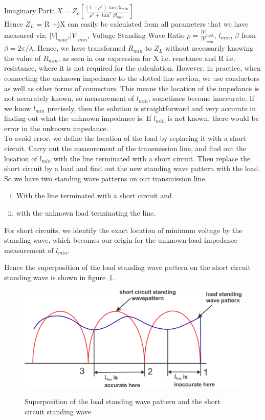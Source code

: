 Imaginary Part: $ X = Z_o[\frac{(1-\rho^{2})\tan\beta l_{min}}{\rho^{2} + \tan^{2}\beta l_{min}}]  $\\

Hence $Z_{L}$ = R +jX can easily be calculated from all parameters that we have measured viz; $|V|_{max}$,$|V|_{min}$, Voltage Standing Wave Ratio $\rho = \frac{|V|_{max}}{|V|_{min}}$, $l_{min}$, $\beta$ from $\beta = 2\pi/\lambda$. Hence, we have transformed $R_{min}$ to $Z_{L}$ without necessarily knowing the value of $R_{min}$, as seen in our expression for X i.e. reactance and R i.e. resistance, where it is not required for the calculation. 
However, in practice, when connecting the unknown impedance to the slotted line section, we use conductors as well as other forms of connectors. This means the location of the impedance is not accurately known, so measurement of $l_{min}$, sometimes become inaccurate. If we know $l_{min}$ precisely, then the solution is straightforward and very accurate in finding out what the unknown impedance is. If $l_{min}$ is not known, there would be error in the unknown impedance.\\

To avoid error, we define the location of the load by replacing it with a short circuit. Carry out the measurement of the transmission line, and find out the location of $l_{min}$ with the line terminated with a short circuit. Then replace the short circuit by a load and find out the new standing wave pattern with the load. So we have two standing wave patterns on our transmission line. 
\begin{enumerate}[(i)]
\item With the line terminated with a short circuit and 
\item with the unknown load terminating the line.
\end{enumerate}
For short circuits, we identify the exact location of minimum voltage by the standing wave, which becomes our origin for the unknown load impedance measurement of $l_{min}$.

Hence the superposition of the load standing wave pattern on the short circuit standing wave is shown in figure~\ref{fig:group10diagram2}.
\begin{figure}[h]
\centering
\includegraphics[width=1\linewidth]{./graphics/group10diagram2}\label{fig:group10diagram2}
\caption{Superposition of the load standing wave pattern and the short circuit standing wave}
\end{figure}

